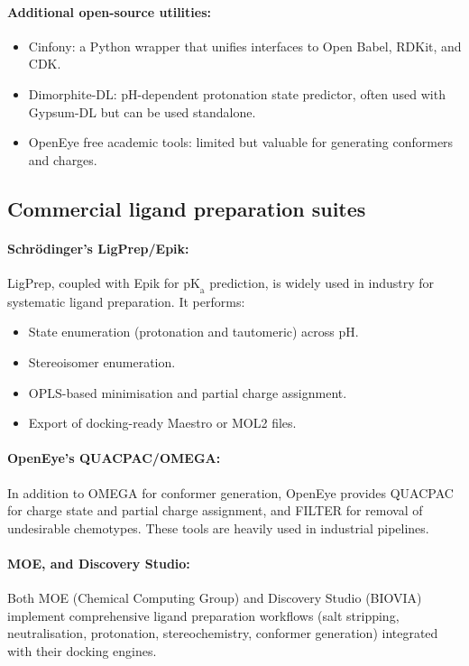 \documentclass[12pt]{article}
\begin{document}
\paragraph{Additional open-source utilities:}
\begin{itemize}
  \item Cinfony\cite{CH6_Cinfony}: a Python wrapper that unifies interfaces to Open Babel, RDKit, and CDK.
  \item Dimorphite-DL\cite{CH6_ropp2019dimorphite}: pH-dependent protonation state predictor, often used with Gypsum-DL but can be used standalone.
  \item OpenEye free academic tools: limited but valuable for generating conformers and charges.
\end{itemize}

\subsection{Commercial ligand preparation suites}

\paragraph{Schr\"odinger's LigPrep/Epik:} LigPrep, coupled with Epik for $\textrm{pK}_\textrm{a}$ prediction, is widely used in industry for systematic ligand preparation\cite{CH6_Sastry2013}. It performs:
\begin{itemize}
  \item State enumeration (protonation and tautomeric) across pH.
  \item Stereoisomer enumeration.
  \item OPLS-based\cite{CH6_jorgensen1988opls} minimisation and partial charge assignment.
  \item Export of docking-ready Maestro or MOL2 files.
\end{itemize}


\paragraph{OpenEye's QUACPAC/OMEGA:} In addition to OMEGA\cite{CH6_Hawkins2010} for conformer generation, OpenEye provides QUACPAC\cite{CH6_openeye2020quacpac} for charge state and partial charge assignment, and FILTER for removal of undesirable chemotypes. These tools are heavily used in industrial pipelines.

\paragraph{MOE, and Discovery Studio:} Both MOE (Chemical Computing Group) and Discovery Studio (BIOVIA) implement comprehensive ligand preparation workflows (salt stripping, neutralisation, protonation, stereochemistry, conformer generation) integrated with their docking engines.
\end{document}
